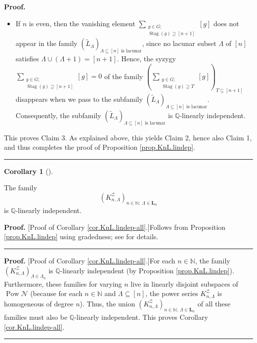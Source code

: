 \documentclass[numbers=enddot,12pt,final,onecolumn,notitlepage]{scrartcl}%
\theoremstyle{definition}
\newtheorem{coro}[theo]{Corollary}
\newenvironment{corollary}[1][]
{\begin{coro}[#1]\begin{leftbar}}
{\end{leftbar}\end{coro}}
\newenvironment{proof}[1][Proof]{\noindent\textbf{#1.} }{\ \rule{0.5em}{0.5em}}
\newenvironment{verlong}{}{}
\newenvironment{vershort}{}{}
\newcommand{\NN}{\mathbb{N}}
\let\sumnonlimits\sum
\renewcommand{\sum}{\sumnonlimits\limits}
\begin{document}
\begin{proof}
\begin{itemize}
\item If $n$ is even, then the vanishing element $\sum_{\substack{g\in
G;\\\operatorname*{Stag}\left(  g\right)  \supseteq\left[  n+1\right]
}}\left[  g\right]  $ does not appear in the family $\left(  \widetilde{L}%
_{\Lambda}\right)  _{\Lambda\subseteq\left[  n\right]  \text{ is lacunar}}$,
since no lacunar subset $\Lambda$ of $\left[  n\right]  $ satisfies
$\Lambda\cup\left(  \Lambda+1\right)  =\left[  n+1\right]  $. Hence, the
syzygy $\sum_{\substack{g\in G;\\\operatorname*{Stag}\left(  g\right)
\supseteq\left[  n+1\right]  }}\left[  g\right]  =0$ of the family $\left(
\sum_{\substack{g\in G;\\\operatorname*{Stag}\left(  g\right)  \supseteq
T}}\left[  g\right]  \right)  _{T\subseteq\left[  n+1\right]  }$ disappears
when we pass to the subfamily $\left(  \widetilde{L}_{\Lambda}\right)
_{\Lambda\subseteq\left[  n\right]  \text{ is lacunar}}$. Consequently, the
subfamily $\left(  \widetilde{L}_{\Lambda}\right)  _{\Lambda\subseteq\left[
n\right]  \text{ is lacunar}}$ is $\mathbb{Q}$-linearly independent.
\end{itemize}

This proves Claim 3. As explained above, this yields Claim 2, hence also Claim
1, and thus completes the proof of Proposition \ref{prop.KnL.lindep}.
\end{proof}

\begin{corollary}
\label{cor.KnL.lindep-all}The family%
\[
\left(  K_{n,\Lambda}^{\mathcal{Z}}\right) %
_{n \in \NN; \ \Lambda \in \mathbf{L}_n}
\]
is $\mathbb{Q}$-linearly independent.
\end{corollary}

\begin{vershort}
\begin{proof}
[Proof of Corollary \ref{cor.KnL.lindep-all}.]Follows from Proposition
\ref{prop.KnL.lindep} using gradedness; see \cite{verlong} for details.
\end{proof}
\end{vershort}

\begin{verlong}
\begin{proof}
[Proof of Corollary \ref{cor.KnL.lindep-all}.]For each $n\in\mathbb{N}$, the
family $\left(  K_{n,\Lambda}^{\mathcal{Z}}\right)  _{\Lambda\in \Lambda_n}$
is $\mathbb{Q}$-linearly
independent (by Proposition \ref{prop.KnL.lindep}). Furthermore, these
families for varying $n$ live in linearly disjoint subspaces of
$\operatorname*{Pow}\mathcal{N}$ (because for each $n \in \NN$ and $\Lambda
\subseteq\left[  n\right]  $, the power series $K_{n,\Lambda}^{\mathcal{Z}}$
is homogeneous of degree $n$). Thus, the union $\left(  K_{n,\Lambda
}^{\mathcal{Z}}\right)  _{n \in \NN;\ \Lambda \in \mathbf{L}_n}$ of all
these families must also be $\mathbb{Q}%
$-linearly independent.
This proves Corollary \ref{cor.KnL.lindep-all}.
\end{proof}
\end{verlong}
\end{document}
